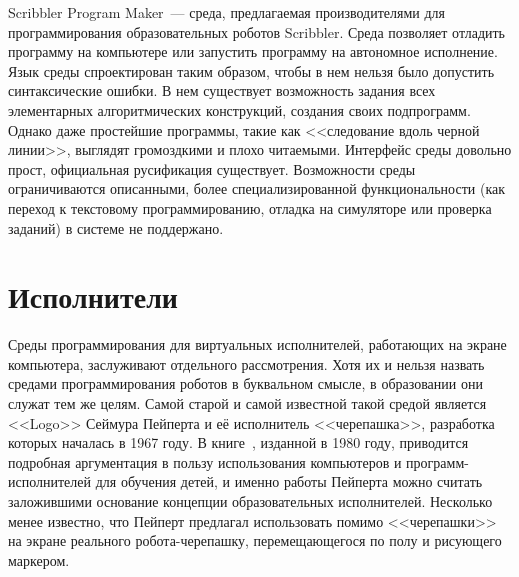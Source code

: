 \documentclass[a5paper]{article}
\begin{document}
Scribbler Program Maker~--- среда, предлагаемая производителями для программирования образовательных роботов 
Scribbler. Среда позволяет отладить программу на компьютере или запустить программу на автономное исполнение. 
Язык среды спроектирован таким образом, чтобы в нем нельзя было допустить синтаксические ошибки. В нем существует 
возможность задания всех элементарных алгоритмических конструкций, создания своих подпрограмм. Однако даже простейшие 
программы, такие как <<следование вдоль черной линии>>, выглядят громоздкими и плохо читаемыми. Интерфейс среды 
довольно прост, официальная русификация существует. Возможности среды ограничиваются 
описанными, более специализированной функциональности (как переход к текстовому программированию, отладка на 
симуляторе или проверка заданий) в системе не поддержано.

\section{Исполнители}

Среды программирования для виртуальных исполнителей, работающих на экране компьютера, заслуживают отдельного 
рассмотрения. Хотя их и нельзя назвать средами программирования роботов в буквальном смысле, в образовании 
они служат тем же целям. Самой старой и самой известной такой средой является <<Logo>> Сеймура Пейперта и 
её исполнитель <<черепашка>>, разработка которых началась в 1967 году. В книге~\cite{papert1980mindstorms}, 
изданной в 1980 году, приводится подробная аргументация в пользу использования компьютеров и 
программ-исполнителей для обучения детей, и именно работы Пейперта можно считать заложившими 
основание концепции образовательных исполнителей. Несколько менее известно, что Пейперт предлагал 
использовать помимо <<черепашки>> на экране реального робота-черепашку, 
перемещающегося по полу и рисующего маркером.
\end{document}
